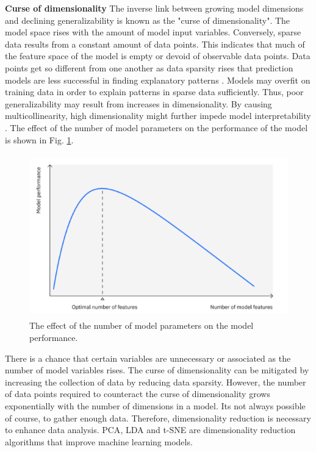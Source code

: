 \textbf{Curse of dimensionality} The inverse link between growing model dimensions and declining generalizability is known as the "curse of dimensionality". The model space rises with the amount of model input variables. Conversely, sparse data results from a constant amount of data points. This indicates that much of the feature space of the model is empty or devoid of observable data points. Data points get so different from one another as data sparsity rises that prediction models are less successful in finding explanatory patterns \cite{Goodfellow-et-al-2016}. Models may overfit on training data in order to explain patterns in sparse data sufficiently. Thus, poor generalizability may result from increases in dimensionality. By causing multicollinearity, high dimensionality might further impede model interpretability \cite{bellman46adaptive}. The effect of the number of model parameters on the performance of the model is shown in Fig. \ref{fig:dimensionality_reduction}.
\begin{figure}[t]
  \centering
  \includegraphics[width=350pt,height=200pt]{pictures/curse_of_dimensionality.PNG}
  \caption{The effect of the number of model parameters on the model performance.\cite{dr}}
  \label{fig:dimensionality_reduction}
\end{figure} 
 There is a chance that certain variables are unnecessary or associated as the number of model variables rises. The curse of dimensionality can be mitigated by increasing the collection of data by reducing data sparsity. However, the number of data points required to counteract the curse of dimensionality grows exponentially with the number of dimensions in a model. Its not always possible of course, to gather enough data. Therefore, dimensionality reduction is necessary to enhance data analysis. \ac{PCA}, \ac{LDA} and \ac{t-SNE} are dimensionality reduction algorithms that improve machine learning models.\cite{deng2022dimensionality}


